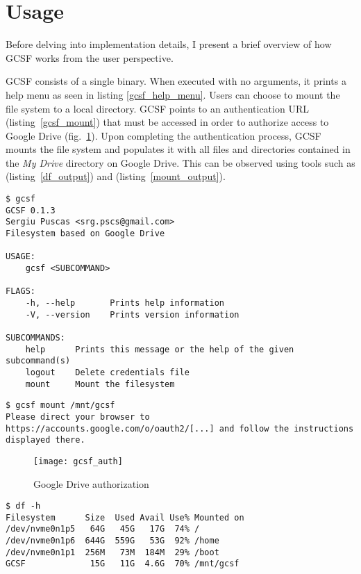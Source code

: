 \section{Usage}

Before delving into implementation details, I present a brief overview of how GCSF works from the user perspective.

GCSF consists of a single binary. When executed with no arguments, it prints a help menu as seen in listing \ref{gcsf_help_menu}. Users can choose to mount the file system to a local directory. GCSF points to an authentication URL (listing~\ref{gcsf_mount}) that must be accessed in order to authorize access to Google Drive (fig.~\ref{fig:drive_auth}). Upon completing the authentication process, GCSF mounts the file system and populates it with all files and directories contained in the \emph{My Drive} directory on Google Drive. This can be observed using tools such as  (listing~\ref{df_output}) and  (listing~\ref{mount_output}).

\begin{lstlisting}[basicstyle=\footnotesize\ttfamily,caption=GCSF help menu,frame=single,label=gcsf_help_menu,float]
$ gcsf
GCSF 0.1.3
Sergiu Puscas <srg.pscs@gmail.com>
Filesystem based on Google Drive

USAGE:
    gcsf <SUBCOMMAND>

FLAGS:
    -h, --help       Prints help information
    -V, --version    Prints version information

SUBCOMMANDS:
    help      Prints this message or the help of the given subcommand(s)
    logout    Delete credentials file
    mount     Mount the filesystem
\end{lstlisting}

\begin{lstlisting}[basicstyle=\footnotesize\ttfamily,caption=GCSF mount,frame=single,label=gcsf_mount,float]
$ gcsf mount /mnt/gcsf
Please direct your browser to https://accounts.google.com/o/oauth2/[...] and follow the instructions displayed there.
\end{lstlisting}

\begin{figure}[bpt]
\caption{Google Drive authorization}
\label{fig:drive_auth}
\centering
\texttt{[image: gcsf\_auth]}
\end{figure}

\begin{lstlisting}[basicstyle=\footnotesize\ttfamily,caption=Size and capacity of mounted filesystems,frame=single,label=df_output,float]
$ df -h
Filesystem      Size  Used Avail Use% Mounted on
/dev/nvme0n1p5   64G   45G   17G  74% /
/dev/nvme0n1p6  644G  559G   53G  92% /home
/dev/nvme0n1p1  256M   73M  184M  29% /boot
GCSF             15G   11G  4.6G  70% /mnt/gcsf
\end{lstlisting}

